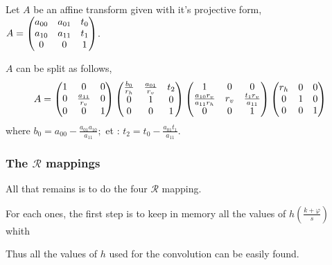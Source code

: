 		\begin{prop}
		\label{propositionDecompositionAffinite}
		Let $A$ be an affine transform given with it's projective form, $A = \begin{pmatrix} a_{00} & a_{01} & t_0\\ a_{10} & a_{11} & t_1\\ 0&0&1 \end{pmatrix}$.
		
		$A$ can be split as follows,
		\[
			A = 
			\begin{pmatrix} 1 & 0 & 0\\ 0 & \frac{a_{11}}{r_v} & 0\\ 0 & 0 & 1 \end{pmatrix}
			\begin{pmatrix} \frac{b_{0}}{r_h} & \frac{a_{01}}{r_v} & t_2\\ 0 & 1 & 0\\ 0 & 0 & 1 \end{pmatrix}
			\begin{pmatrix} 1 & 0 & 0\\ \frac{a_{10}r_v}{a_{11}r_h} & r_v & \frac{t_1r_v}{a_{11}}\\ 0 & 0 & 1 \end{pmatrix}
			\begin{pmatrix} r_h & 0 & 0\\ 0 & 1 & 0\\ 0 & 0 & 1 \end{pmatrix}
		\]
where $b_0 = a_{00} - \frac{a_{01}a_{10}}{a_{11}};$ et : $t_2 = t_0 - \frac{a_{01}t_1}{a_{11}}$.
\end{prop}
	\subsubsection{The $\mathcal R$ mappings}
		
		All that remains is to do the four $\mathcal R$ mapping.
		
		For each ones, the first step is to keep in memory all the values of $h(\frac{k+\varphi}{s})$ whith
		
		Thus all the values of $h$ used for the convolution can be easily found.



